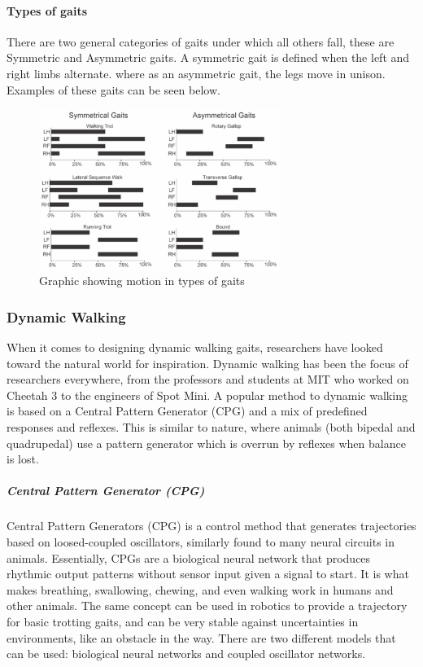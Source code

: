             \paragraph*{Types of gaits}
            There are two general categories of gaits under which all others fall, these are Symmetric and Asymmetric gaits. A symmetric gait is defined when the left and right limbs alternate. where as an asymmetric gait, the legs move in unison. Examples of these gaits can be seen below.  
            \begin{figure}[H]
                \centering
                \includegraphics[width=0.7\textwidth]{figures/Gait_graphs_v2.png}
                \caption{Graphic showing motion in types of gaits}
                \label{fig:GaitMotion}
            \end{figure}

        \subsubsection{Dynamic Walking}
            When it comes to designing dynamic walking gaits, researchers have looked toward the natural world for inspiration. Dynamic walking has been the focus of researchers everywhere, from the professors and students at MIT who worked on Cheetah 3 \cite{MIT_Cheetah3_Paper} to the engineers of Spot Mini. \cite{SpotMiniBostonDynamics} A popular method to dynamic walking is based on a Central Pattern Generator (CPG) and a mix of predefined responses and reflexes. This is similar to nature, where animals (both bipedal and quadrupedal) use a pattern generator which is overrun by reflexes when balance is lost.
            \subparagraph*{Central Pattern Generator (CPG)}
                Central Pattern Generators (CPG) is a control method that generates trajectories based on loosed-coupled oscillators, similarly found to many neural circuits in animals. Essentially, CPGs are a biological neural network that produces rhythmic output patterns without sensor input given a signal to start.\cite{CPG_StateOfTheArt} It is what makes breathing, swallowing, chewing, and even walking work in humans and other animals. The same concept can be used in robotics to provide a trajectory for basic trotting gaits, and can be very stable against uncertainties in environments, like an obstacle in the way. There are two different models that can be used: biological neural networks and coupled oscillator networks.
               
